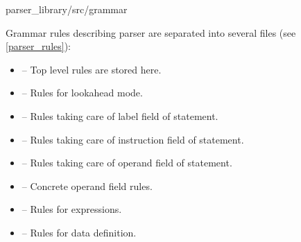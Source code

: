 {parser\_library/src/grammar}

Grammar rules describing parser are separated into several files (see \cref{parser_rules}):
\begin{itemize}
	\item {} -- Top level rules are stored here.
	\item {} -- Rules for lookahead mode.
	\item {} -- Rules taking care of label field of statement.
	\item {} -- Rules taking care of instruction field of statement.
	\item {} -- Rules taking care of operand field of statement.
	\item {} -- Concrete operand field rules.
	\item {} -- Rules for expressions.
	\item {} -- Rules for data definition.
\end{itemize}

